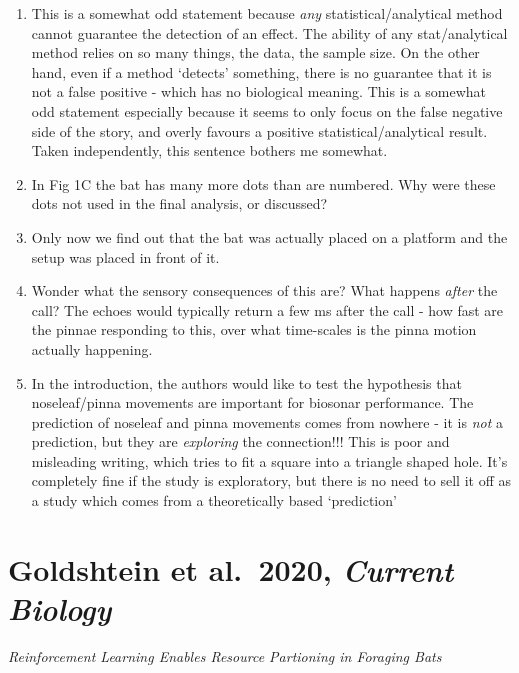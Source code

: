 \documentclass[
]{book}
\providecommand{\tightlist}{%
  \setlength{\itemsep}{0pt}\setlength{\parskip}{0pt}}
\begin{document}
\begin{enumerate}
\def\labelenumi{\arabic{enumi}.}
\tightlist
\item
  This is a somewhat odd statement because \emph{any} statistical/analytical method cannot guarantee the detection of an effect. The ability of any stat/analytical method relies on so many things, the data, the sample size. On the other hand, even if a method `detects' something, there is no guarantee that it is not a false positive - which has no biological meaning. This is a somewhat odd statement especially because it seems to only focus on the false negative side of the story, and overly favours a positive statistical/analytical result. Taken independently, this sentence bothers me somewhat.
\item
  In Fig 1C the bat has many more dots than are numbered. Why were these dots not used in the final analysis, or discussed?
\item
  Only now we find out that the bat was actually placed on a platform and the setup was placed in front of it.
\item
  Wonder what the sensory consequences of this are? What happens \emph{after} the call? The echoes would typically return a few ms after the call - how fast are the pinnae responding to this, over what time-scales is the pinna motion actually happening.
\item
  In the introduction, the authors would like to test the hypothesis that noseleaf/pinna movements are important for biosonar performance. The prediction of noseleaf and pinna movements comes from nowhere - it is \emph{not} a prediction, but they are \emph{exploring} the connection!!! This is poor and misleading writing, which tries to fit a square into a triangle shaped hole. It's completely fine if the study is exploratory, but there is no need to sell it off as a study which comes from a theoretically based `prediction'
\end{enumerate}

\hypertarget{goldshtein-et-al.-2020-current-biology}{%
\chapter{\texorpdfstring{Goldshtein et al.~2020, \emph{Current Biology}}{Goldshtein et al.~2020, Current Biology}}\label{goldshtein-et-al.-2020-current-biology}}


\emph{Reinforcement Learning Enables Resource Partioning in Foraging Bats} \citep{goldshtein2020reinforcement}
\end{document}
